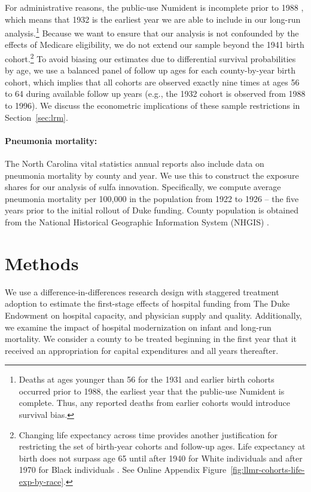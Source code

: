 \documentclass[12pt]{article}
\begin{document}
For administrative reasons, the public-use Numident is incomplete prior to 1988 , which means that 1932 is the earliest year we are able to include in our long-run analysis.\footnote{Deaths at ages younger than 56 for the 1931 and earlier birth cohorts occurred prior to 1988, the earliest year that the public-use Numident is complete. 
Thus, any reported deaths from earlier cohorts would introduce survival bias.} Because we want to ensure that our analysis is not confounded by the effects of Medicare eligibility, we do not extend our sample beyond the 1941 birth cohort.\footnote{Changing life expectancy across time provides another justification for restricting the set of birth-year cohorts and follow-up ages. Life expectancy at birth does not surpass age 65 until after 1940 for White individuals and after 1970 for Black individuals . See Online Appendix Figure~\ref{fig:llmr-cohorts-life-exp-by-race}.}
To avoid biasing our estimates due to differential survival probabilities by age, we use a balanced panel of follow up ages for each county-by-year birth cohort, which implies that all cohorts are observed exactly nine times at ages 56 to 64 during available follow up years (e.g., the 1932 cohort is observed from 1988 to 1996).
We discuss the econometric implications of these sample restrictions in Section~\ref{sec:lrm}.

\paragraph{Pneumonia mortality:} The North Carolina vital statistics annual reports also include data on pneumonia mortality by county and year.
We use this to construct the exposure shares for our analysis of sulfa innovation.
Specifically, we compute average pneumonia mortality per 100,000 in the population from 1922 to 1926 -- the five years prior to the initial rollout of Duke funding.
County population is obtained from the National Historical Geographic Information System (NHGIS) . 

\section{Methods} \label{sec:method}

We use a difference-in-differences research design with staggered treatment adoption to estimate the first-stage effects of hospital funding from The Duke Endowment on hospital capacity, and physician supply and quality. Additionally, we examine the impact of hospital modernization on infant and long-run mortality. We consider a county to be treated beginning in the first year that it received an appropriation for capital expenditures and all years thereafter.
\end{document}
